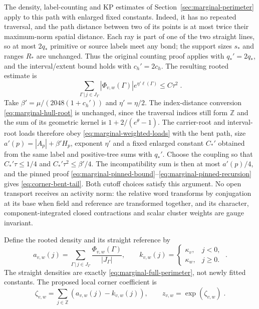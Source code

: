 \documentclass[11pt]{article}
\begin{document}
The density, label-counting and KP estimates of Section~\ref{sec:marginal-perimeter} apply to this path with enlarged fixed constants. Indeed, it has no repeated traversal, and the path distance between two of its points is at most twice their maximum-norm spatial distance. Each ray is part of one of the two straight lines, so at most $2q_*$ primitive or source labels meet any bond; the support sizes $s_*$ and ranges $R_*$ are unchanged. Thus the original counting proof applies with $q_*'=2q_*$, and the interval/extent bound holds with $c_h'=2c_h$. The resulting rooted estimate is
\begin{equation}\label{eq:corner-bent-tail}
    \sum_{\Gamma\, | \,j\in J_\Gamma}
        |\Phi_{v,w}(\Gamma)|e^{\eta'\ell(\Gamma)}
        \leq C\tau^2\;.
\end{equation}
Take $\beta'=\mu/(2048(1+c_h'))$ and $\eta'=\eta/2$. The index-distance conversion \eqref{eq:marginal-hull-root} is unchanged, since the traversal indices still form $\mathbb Z$ and the sum of its geometric kernel is $1+2/(e^\theta-1)$. The carrier-root and interval-root loads therefore obey \eqref{eq:marginal-weighted-loads} with the bent path, size $a'(p)=|A_p|+\beta'H_p$, exponent $\eta'$ and a fixed enlarged constant $C_*'$ obtained from the same label and positive-tree sums with $q_*'$. Choose the coupling so that $C_*'\tau\leq 1/4$ and $C_*'\tau^2\leq\beta'/4$. The incompatibility sum is then at most $a'(p)/4$, and the pinned proof \eqref{eq:marginal-pinned-bound}--\eqref{eq:marginal-pinned-recursion} gives \eqref{eq:corner-bent-tail}. Both cutoff choices satisfy this argument. No open transport receives an activity norm: the relative word transforms by conjugation at its base when field and reference are transformed together, and its character, component-integrated closed contractions and scalar cluster weights are gauge invariant.

Define the rooted density and its straight reference by
\begin{equation}\label{eq:corner-rooted-density}
    a_{v,w}(j)=\sum_{\Gamma\, | \,j\in J_\Gamma}
        \frac{\Phi_{v,w}(\Gamma)}{|J_\Gamma|},
    \qquad
    k_{v,w}(j)=
    \begin{cases}
        \kappa_v,&j<0,\\
        \kappa_w,&j\geq 0.
    \end{cases}
    \;.
\end{equation}
The straight densities are exactly \eqref{eq:marginal-full-perimeter}, not newly fitted constants. The proposed local corner coefficient is
\begin{equation}\label{eq:corner-local-extraction}
    \boxed{\displaystyle
        \zeta_{v,w}=\sum_{j\in \mathbb Z}
            \left(a_{v,w}(j)-k_{v,w}(j)\right),
        \qquad z_{v,w}=\exp(\zeta_{v,w})}\;.
\end{equation}
\end{document}
